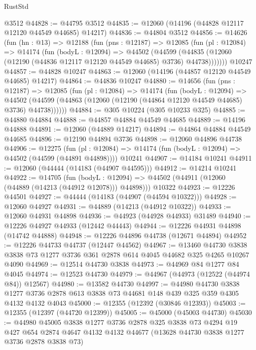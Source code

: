 \begin{lexlean}{RustStd}
\begin{coremodule}
    @3512
@44828 := @44795 @3512
@44835 := @12060 (@14196 (@44828 @12117 @12120 @44549 @44685) @14217)
@44836 := @44804 @3512
@44856 := @14626
    (fun (hn : @13) =>
    @12188
      (fun (pns : @12187) =>
      @12085
        (fun (pl : @12084) =>
        @14174
          (fun (bodyL : @12094) =>
          @44502
            (@44599
              (@44835 (@12060 (@12190 (@44836 @12117 @12120 @44549 @44685) @3736) @44738)))))))
    @10247
@44857 := @44828 @10247
@44863 := @12060 (@14196 (@44857 @12120 @44549 @44685) @14217)
@44864 := @44836 @10247
@44880 := @14656
    (fun (pns : @12187) =>
    @12085
      (fun (pl : @12084) =>
      @14174
        (fun (bodyL : @12094) =>
        @44502 (@44599 (@44863 (@12060 (@12190 (@44864 @12120 @44549 @44685) @3736) @44738))))))
@44884 := @305 @10224 (@305 @10233 @325)
@44885 := @44880 @44884
@44888 := @44857 @44884 @44549 @44685
@44889 := @14196 @44888
@44891 := @12060 (@44889 @14217)
@44894 := @44864 @44884 @44549 @44685
@44896 := @12190 @44894 @3736
@44898 := @12060 @44896 @44738
@44906 := @12275
    (fun (pl : @12084) => @14174 (fun (bodyL : @12094) => @44502 (@44599 (@44891 @44898))))
    @10241
@44907 := @14184 @10241
@44911 := @12060 (@44444 (@14183 (@44907 @44595)))
@44912 := @14214 @10241
@44922 := @14705
    (fun (bodyL : @12094) => @44502 (@44911 (@12060 (@44889 (@14213 (@44912 @12078))) @44898)))
    @10322
@44923 := @12226 @44501
@44927 := @44444 (@14183 (@44907 (@44594 @10322)))
@44928 := @12060 @44927
@44931 := @44889 (@14213 (@44912 @10322))
@44933 := @12060 @44931 @44898
@44936 := @44923 (@44928 @44933) @31489
@44940 := @12226 @44927 @44933 (@12442 @44443)
@44944 := @12226 @44931 @44898 (@14742 @44888)
@44948 := @12226 @44896 @44738 (@12671 @44894)
@44952 := @12226 @44733 @44737 (@12447 @44562)
@44967 := @13460
    @44730
    @3838
    @3838
    @73
    @1277
    @3736
    @361
    @2878
    @614
    @4045
    @44682
    @325
    @4265
    @10267
    @4090
@44969 := @12514 @44730 @3838
@44973 := @44969 @84 @1277 @84 @4045
@44974 := @12523 @44730
@44979 := @44967 (@44973 (@12522 (@44974 @84)) @12567)
@44980 := @13582 @44730
@44997 := @44980
    @44730
    @3838
    @1277
    @3736
    @2878
    @613
    @3838
    @73
    @44681
    @148
    @439
    @325
    @359
    @4305
    @4132
    @4132
    @4043
@45000 := @12355 (@12392 (@30846 @12393))
@45003 := @12355 (@12397 (@44720 @12399))
@45005 := @45000 (@45003 @44730)
@45030 := @44980
    @45005
    @3838
    @1277
    @3736
    @2878
    @325
    @3838
    @73
    @4294
    @19
    @427
    @654
    @2874
    @4647
    @4132
    @4132
    @44677
    (@13628 @44730 @3838 @1277 @3736 @2878 @3838 @73)

\end{coremodule}
\end{lexlean}
